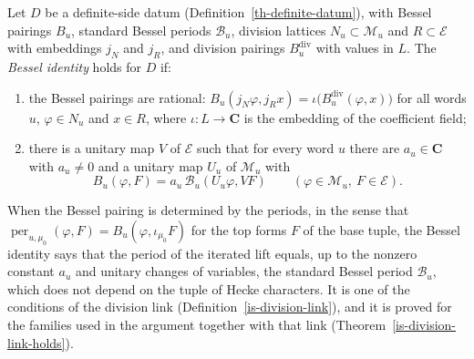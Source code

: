 \begin{definition}\label{th-bessel-identity}
Let $D$ be a definite-side datum (Definition~\ref{th-definite-datum}), with
Bessel pairings $B_u$, standard Bessel periods $\mathcal B_u$, division
lattices $N_u\subset\mathcal M_u$ and $R\subset\mathcal E$ with embeddings
$j_N$ and $j_R$, and division pairings $B^{\mathrm{div}}_u$ with values in $L$.
The \emph{Bessel identity} holds for $D$ if:
\begin{enumerate}
\item the Bessel pairings are rational:
  $B_u(j_N\varphi,j_Rx)=\iota\bigl(B^{\mathrm{div}}_u(\varphi,x)\bigr)$ for all
  words $u$, $\varphi\in N_u$ and $x\in R$, where $\iota\colon L\to\mathbf C$
  is the embedding of the coefficient field;
\item there is a unitary map $V$ of $\mathcal E$ such that for every word $u$
  there are $a_u\in\mathbf C$ with $a_u\neq0$ and a unitary map $U_u$ of
  $\mathcal M_u$ with
  \[
  B_u(\varphi,F)=a_u\,\mathcal B_u(U_u\varphi,VF)\qquad(\varphi\in\mathcal M_u,\ F\in\mathcal E).
  \]
\end{enumerate}
\end{definition}

When the Bessel pairing is determined by the periods, in the sense that
$\operatorname{per}_{u,\mu_0}(\varphi,F)=B_u(\varphi,\iota_{\mu_0}F)$ for the
top forms $F$ of the base tuple, the Bessel identity says that the period of
the iterated lift equals, up to the nonzero constant $a_u$ and unitary changes
of variables, the standard Bessel period $\mathcal B_u$, which does not depend
on the tuple of Hecke characters. It is one of the conditions of the division
link (Definition~\ref{is-division-link}), and it is proved for the families
used in the argument together with that link
(Theorem~\ref{is-division-link-holds}).

